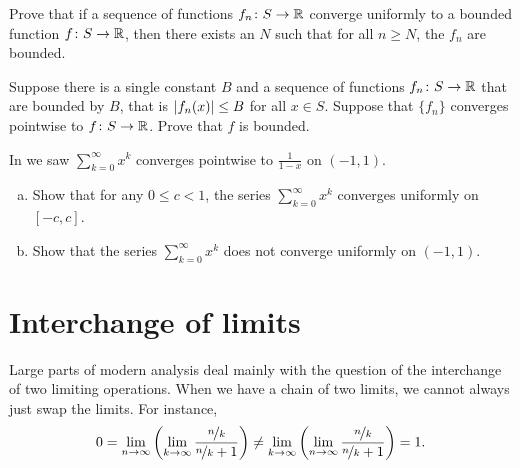 \begin{exercise}
Prove that
if a sequence of functions $f_n \colon S \to {\mathbb{R}}$
converge uniformly to a bounded function $f \colon S \to {\mathbb{R}}$,
then there exists an $N$ such that for all $n \geq N$, the $f_n$
are bounded.
\end{exercise}

\begin{exercise}
Suppose there is a single constant $B$ and
a sequence of functions
$f_n \colon S \to {\mathbb{R}}$ that are bounded by $B$,
that is $\left\lvert {f_n(x)} \right\rvert \leq B$ for all $x \in S$.
Suppose that $\{ f_n \}$ converges pointwise
to $f \colon S \to {\mathbb{R}}$.
Prove that $f$ is bounded.
\end{exercise}

\begin{exercise}
In  we saw
$\sum_{k=0}^\infty x^k$ converges pointwise to $\frac{1}{1-x}$ on
$(-1,1)$.
\begin{enumerate}[a)]
\item
Show that for any $0 \leq c < 1$, the series
$\sum_{k=0}^\infty x^k$ converges uniformly on $[-c,c]$.
\item
Show that the series $\sum_{k=0}^\infty x^k$ does not converge uniformly
on $(-1,1)$.
\end{enumerate}
\end{exercise}


\sectionnewpage
\section{Interchange of limits}
\label{sec:liminter}


Large parts of modern analysis deal mainly with the question of the
interchange of two limiting operations.  When
we have a chain of two limits, we cannot always just swap the limits.
For instance,
\begin{equation*}
0 = 
\lim_{n\to\infty}
\left(
\lim_{k\to\infty}
\frac{\nicefrac{n}{k}}{\nicefrac{n}{k} + 1}
\right)
\not=
\lim_{k\to\infty}
\left(
\lim_{n\to\infty}
\frac{\nicefrac{n}{k}}{\nicefrac{n}{k} + 1}
\right)
= 1 .
\end{equation*}


